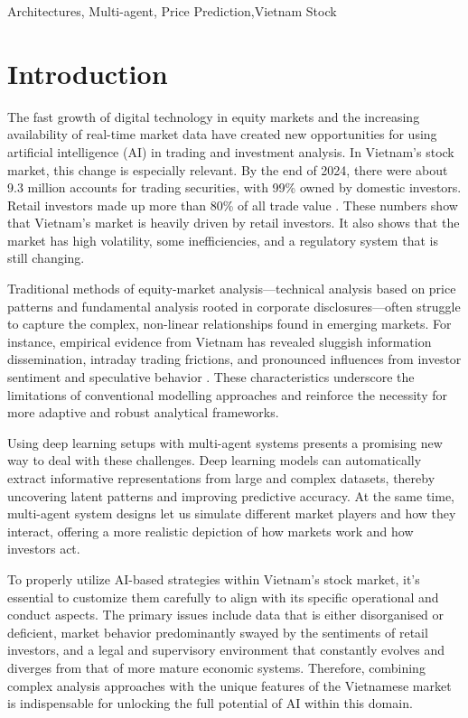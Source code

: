 \documentclass{ieeeaccess}
\begin{document}
\begin{keywords}
Architectures, Multi-agent, Price Prediction,Vietnam Stock
\end{keywords}

\titlepgskip=-21pt

\maketitle

\section{Introduction}
\label{sec:introduction}
The fast growth of digital technology in equity markets and the increasing availability of real-time market data  have created new opportunities for using artificial intelligence (AI) in trading and investment analysis. In Vietnam’s stock market, this change is especially relevant. By the end of 2024, there were about 9.3 million accounts for trading securities, with 99\% owned by domestic investors. Retail investors made up more than 80\% of all trade value \cite{vietnamnews2025}. These numbers show that Vietnam’s market is heavily driven by retail investors. It also shows that the market has high volatility, some inefficiencies, and a regulatory system that is still changing.

Traditional methods of equity-market analysis—technical analysis based on price patterns and fundamental analysis rooted in corporate disclosures—often struggle to capture the complex, non-linear relationships found in emerging markets. For instance, empirical evidence from Vietnam has revealed sluggish information dissemination, intraday trading frictions, and pronounced influences from investor sentiment and speculative behavior \cite{ha2025}. These characteristics underscore the limitations of conventional modelling approaches and reinforce the necessity for more adaptive and robust analytical frameworks.

Using deep learning setups with multi-agent systems presents a promising new way to deal with these challenges. Deep learning models can automatically extract informative representations from large and complex datasets, thereby uncovering latent patterns and improving predictive accuracy. At the same time, multi-agent system designs let us simulate different market players and how they interact, offering a more realistic depiction of how markets work and how investors act.

To properly utilize AI-based strategies within Vietnam's stock market, it's essential to customize them carefully to align with its specific operational and conduct aspects. The primary issues include data that is either disorganised or deficient, market behavior predominantly swayed by the sentiments of retail investors, and a legal and supervisory environment that constantly evolves and diverges from that of more mature economic systems. Therefore, combining complex analysis approaches with the unique features of the Vietnamese market is indispensable for unlocking the full potential of AI within this domain.
\end{document}
